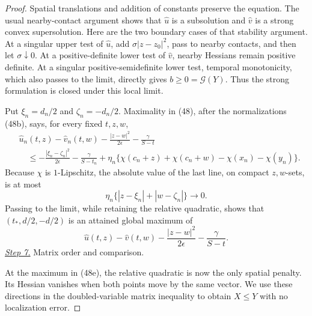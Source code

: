 \documentclass{aomart}
\theoremstyle{definition}
\newcommand{\1}{\mathbf 1}
\begin{document}
\begin{proof}
Spatial translations and addition of constants preserve the equation.
The usual nearby-contact argument shows that $\widehat u$ is a
subsolution and $\widehat v$ is a strong convex supersolution.  Here
are the two boundary cases of that stability argument.  At a singular
upper test of $\widehat u$, add
$\sigma|z-z_ 0|^2$, pass to nearby contacts, and then let
$\sigma\downarrow0$.  At a positive-definite lower test of
$\widehat v$, nearby Hessians remain positive definite.  At a
singular positive-semidefinite lower test, temporal monotonicity,
which also passes to the limit, directly gives
$b\geq0=\mathcal G(Y)$.  Thus the strong formulation is closed under this
local limit.

Put $\xi_ n=d_ n/2$ and $\zeta_ n=-d_ n/2$.  Maximality in (48),
after the normalizations (48b), says, for every fixed $t,z,w$,
\begin{equation}
\begin{split}
&\widehat u_ n(t,z)-\widehat v_ n(t,w)
-\frac{|z-w|^2}{2\epsilon}-\frac{\gamma}{S-t}\\
&\quad\leq
-\frac{|\xi_ n-\zeta_ n|^2}{2\epsilon}
-\frac{\gamma}{S-t_ n}
+\eta_ n\{\chi(c_ n+z)+\chi(c_ n+w)
-\chi(x_ n)-\chi(y_ n)\}.                         
\end{split}
\tag{48c}
\end{equation}
Because $\chi$ is $1$-Lipschitz, the absolute value of the last
line, on compact $z,w$-sets, is at most
\begin{equation}
\eta_ n\{|z-\xi_ n|+|w-\zeta_ n|\}\longrightarrow0.
\tag{48d}
\end{equation}
Passing to the limit, while retaining the relative quadratic, shows
that $(t_ *,d/2,-d/2)$ is an attained global maximum of
\begin{equation}
\widehat u(t,z)-\widehat v(t,w)
-\frac{|z-w|^2}{2\epsilon}-\frac{\gamma}{S-t}.
\tag{48e}
\end{equation}
\smallskip\noindent
\underline{\textit{Step 7.}} Matrix order and comparison.

At the maximum in (48e), the relative quadratic is now the only
spatial penalty.  Its Hessian vanishes when both points move by the
same vector.  We use these directions in the doubled-variable matrix
inequality to obtain $X\leq Y$ with no localization error.


\end{proof}
\end{document}
